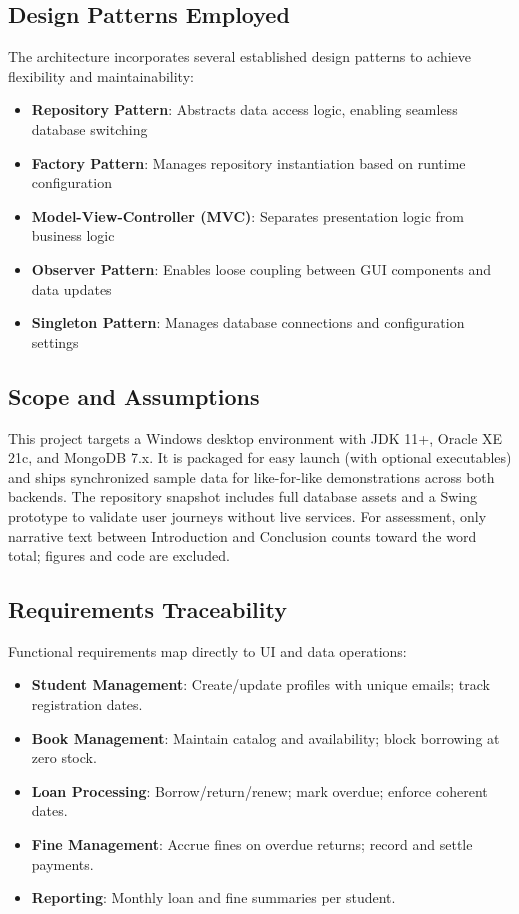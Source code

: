 \documentclass[12pt,a4paper]{article}
\begin{document}
\subsection{Design Patterns Employed}

The architecture incorporates several established design patterns to achieve flexibility and maintainability:

\begin{itemize}
    \item \textbf{Repository Pattern}: Abstracts data access logic, enabling seamless database switching
    \item \textbf{Factory Pattern}: Manages repository instantiation based on runtime configuration
    \item \textbf{Model-View-Controller (MVC)}: Separates presentation logic from business logic
    \item \textbf{Observer Pattern}: Enables loose coupling between GUI components and data updates
    \item \textbf{Singleton Pattern}: Manages database connections and configuration settings
\end{itemize}

\subsection{Scope and Assumptions}

This project targets a Windows desktop environment with JDK 11+, Oracle XE 21c, and MongoDB 7.x. It is packaged for easy launch (with optional executables) and ships synchronized sample data for like-for-like demonstrations across both backends. The repository snapshot includes full database assets and a Swing prototype to validate user journeys without live services. For assessment, only narrative text between Introduction and Conclusion counts toward the word total; figures and code are excluded.

\subsection{Requirements Traceability}

Functional requirements map directly to UI and data operations:
\begin{itemize}
    \item \textbf{Student Management}: Create/update profiles with unique emails; track registration dates.
    \item \textbf{Book Management}: Maintain catalog and availability; block borrowing at zero stock.
    \item \textbf{Loan Processing}: Borrow/return/renew; mark overdue; enforce coherent dates.
    \item \textbf{Fine Management}: Accrue fines on overdue returns; record and settle payments.
    \item \textbf{Reporting}: Monthly loan and fine summaries per student.
\end{itemize}
\end{document}
